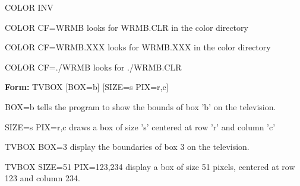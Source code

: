 {\newpage\clearpage
{}%
\begin{hanging}
  \item{COLOR INV}
\end{hanging}%
\lthtmlfigureZ
\lthtmlcheckvsize\clearpage}

{\newpage\clearpage
{}%
\begin{example}
  \item[COLOR CF=WRMB\hfill]{looks for WRMB.CLR in the color directory}
  \item[COLOR CF=WRMB.XXX\hfill]{looks for WRMB.XXX in the color directory}
  \item[COLOR CF=./WRMB\hfill]{looks for ./WRMB.CLR}
\end{example}%
\lthtmlfigureZ
\lthtmlcheckvsize\clearpage}

{\newpage\clearpage
{}%
\begin{command}
  \item[\textbf{Form: } TVBOX {[BOX=b]} {[SIZE=s PIX=r,c]}\hfill]{}
  \item[BOX=b]{tells the program to show the bounds
       of box 'b' on the television.}
  \item[SIZE=s PIX=r,c]{draws a box of size 's' centered at row 
       'r' and column 'c'}
\end{command}%
\lthtmlfigureZ
\lthtmlcheckvsize\clearpage}

{\newpage\clearpage
{}%
\begin{example}
  \item[TVBOX BOX=3\hfill]{display the boundaries of box 3
       on the television.}
  \item[TVBOX SIZE=51 PIX=123,234\hfill]{display a box of size 51
       pixels, centered at row 123 and column 234.}
\end{example}%
\lthtmlfigureZ
\lthtmlcheckvsize\clearpage}

